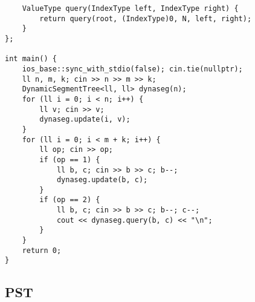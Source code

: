 \documentclass[landscape, 8pt, a4paper, oneside, twocolumn]{extarticle}
\begin{document}
\begin{verbatim}
    ValueType query(IndexType left, IndexType right) {
        return query(root, (IndexType)0, N, left, right);
    }
};

int main() {
    ios_base::sync_with_stdio(false); cin.tie(nullptr);
    ll n, m, k; cin >> n >> m >> k;
    DynamicSegmentTree<ll, ll> dynaseg(n);
    for (ll i = 0; i < n; i++) {
        ll v; cin >> v;
        dynaseg.update(i, v);
    }
    for (ll i = 0; i < m + k; i++) {
        ll op; cin >> op;
        if (op == 1) {
            ll b, c; cin >> b >> c; b--;
            dynaseg.update(b, c);
        }
        if (op == 2) {
            ll b, c; cin >> b >> c; b--; c--;
            cout << dynaseg.query(b, c) << "\n";
        }
    }
    return 0;
}
    \end{verbatim}
    \subsection{PST}
\end{document}
